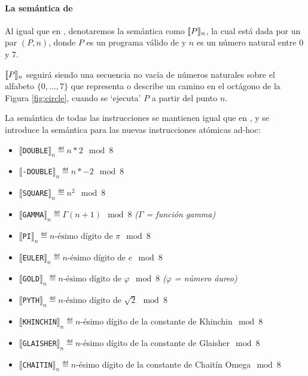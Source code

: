 \paragraph{La semántica de \gramgeoprima}

Al igual que en \gramgeo, denotaremos la semántica como $\llbracket P\rrbracket_n$, la cual está dada por un par $(P,n)$, donde $P$ es un programa válido de \gramgeoprima y $n$ es un número natural entre 0 y 7.

$\llbracket P\rrbracket_n$ seguirá siendo una secuencia no vacía de números naturales sobre el alfabeto $\{0,\dots,7\}$ que representa o describe un camino en el octágono de la Figura \ref{fig:circle}, cuando se `ejecuta' $P$ a partir del punto $n$. 

La semántica de todas las instrucciones se mantienen igual que en \gramgeo, y se introduce la semántica para las nuevas instrucciones atómicas ad-hoc:

\begin{itemize}
\item $\llbracket$\verb#DOUBLE#$\rrbracket_n  \eqdef  n * 2 \mod 8$ 
\item $\llbracket$\verb#-DOUBLE#$\rrbracket_n  \eqdef  n * -2 \mod 8$  
\item $\llbracket$\verb#SQUARE#$\rrbracket_n  \eqdef  n^2 \mod 8$  
\item $\llbracket$\verb#GAMMA#$\rrbracket_n  \eqdef  \Gamma(n+1) \mod 8$  \textit{($\Gamma$ = función gamma)}
\item $\llbracket$\verb#PI#$\rrbracket_n  \eqdef  n\text{-ésimo dígito de } \pi \mod 8$  

\item $\llbracket$\verb#EULER#$\rrbracket_n  \eqdef  n\text{-ésimo dígito de } e \mod 8$  
\item $\llbracket$\verb#GOLD#$\rrbracket_n  \eqdef  n\text{-ésimo dígito de } \varphi \mod 8$  \textit{($\varphi$ = número áureo)}
\item $\llbracket$\verb#PYTH#$\rrbracket_n  \eqdef n\text{-ésimo dígito de } \sqrt{2} \mod 8$
\item $\llbracket$\verb#KHINCHIN#$\rrbracket_n  \eqdef  n$-ésimo dígito de la constante de Khinchin$ \mod 8$  
\item $\llbracket$\verb#GLAISHER#$\rrbracket_n  \eqdef  n$-ésimo dígito de la constante de Glaisher$ \mod 8$  
\item $\llbracket$\verb#CHAITIN#$\rrbracket_n  \eqdef
 n $-ésimo dígito de la constante de Chaitín Omega$ \mod 8$  
\end{itemize}

